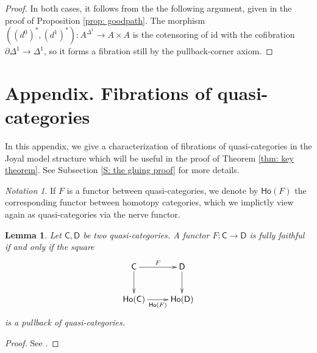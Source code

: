 \documentclass[a4paper,12pt]{amsart}
\newcommand{\ho}[1]{\mathsf{Ho}(#1)}
\theoremstyle{plain}
\newtheorem{lemma}[theorem]{Lemma}%
\theoremstyle{definition}
\theoremstyle{remark}
\newtheorem{notation}[theorem]{\sc Notation}%
\begin{document}
\begin{proof}
    In both cases, it follows from the the following argument, given in the proof of Proposition \ref{prop: goodpath}. The morphism $((d^0)^*,(d^1)^*): A^{\Delta^1}\rightarrow A\times A$ is the cotensoring of $\mathrm{id}$ with the cofibration $\partial\Delta^1\rightarrow \Delta^1$, so it forms a fibration still  by the pullback-corner axiom.
\end{proof}

\vspace{1pc}

\renewcommand{\thesection}{B}

\section{Appendix. Fibrations of quasi-categories}\label{Appendix B: fibrations of quasi-categories}

\vspace{2.5pc}

In this appendix, we give a characterization of fibrations of quasi-categories in the Joyal model structure which will be useful in the proof of Theorem \ref{thm: key theorem}. See Subsection \ref{S: the gluing proof} for more details.

\begin{notation}
If $F$ is a functor  between quasi-categories, we denote by $\ho{F}$ the corresponding functor between homotopy categories, which we implictly view again as quasi-categories via the nerve functor.
\end{notation}

\begin{lemma}\label{pullbackff}
Let $\mathsf{C},\mathsf{D}$ be two quasi-categories. A functor $F:\mathsf{C}\rightarrow\mathsf{D}$ is fully faithful if and only if the square
\[
\xymatrix{
\mathsf{C}\ar[r]^-F\ar[d] & \mathsf{D}\ar[d] \\
\ho{\mathsf{C}}\ar[r]_-{\ho{F}} & \ho{\mathsf{D}}
}
\]
is a pullback of quasi-categories.
\end{lemma}
\begin{proof}
See \cite[Remark 1.2.11.1]{Lurie09}.
\end{proof}
\end{document}
